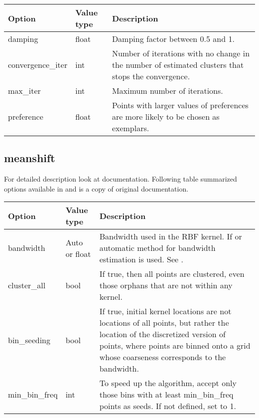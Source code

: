 \documentclass[a4paper,10pt,english]{sphinxmanual}
\begin{document}
\begin{tabulary}{\linewidth}{|L|L|L|}
\hline
\textsf{\relax 
Option
} & \textsf{\relax 
Value type
} & \textsf{\relax 
Description
}\\
\hline
damping
 & 
float
 & 
Damping factor between 0.5 and 1.
\\
\hline
convergence\_iter
 & 
int
 & 
Number of iterations with no change in the number of estimated
clusters that stops the convergence.
\\
\hline
max\_iter
 & 
int
 & 
Maximum number of iterations.
\\
\hline
preference
 & 
float
 & 
Points with larger values of preferences are more likely to be
chosen as exemplars.
\\
\hline\end{tabulary}



\subsection{meanshift}
\label{valve/valve_config:meanshift}
For detailed description look at \href{http://scikit-learn.org/stable/modules/generated/sklearn.cluster.MeanShift.html\#sklearn.cluster.MeanShift}{} documentation. Following table summarized options available in  and is a copy of original documentation.

\begin{tabulary}{\linewidth}{|L|L|L|}
\hline
\textsf{\relax 
Option
} & \textsf{\relax 
Value type
} & \textsf{\relax 
Description
}\\
\hline
bandwidth
 & 
Auto or float
 & 
Bandwidth used in the RBF kernel. If  or 
automatic method for bandwidth estimation is used. See
\href{http://scikit-learn.org/stable/modules/generated/sklearn.cluster.estimate\_bandwidth.html\#sklearn.cluster.estimate\_bandwidth}{}.
\\
\hline
cluster\_all
 & 
bool
 & 
If true, then all points are clustered, even those orphans that
are not within any kernel.
\\
\hline
bin\_seeding
 & 
bool
 & 
If true, initial kernel locations are not locations of all
points, but rather the location of the discretized version of
points, where points are binned onto a grid whose coarseness
corresponds to the bandwidth.
\\
\hline
min\_bin\_freq
 & 
int
 & 
To speed up the algorithm, accept only those bins with at least
min\_bin\_freq points as seeds. If not defined, set to 1.
\\
\hline\end{tabulary}
\end{document}
